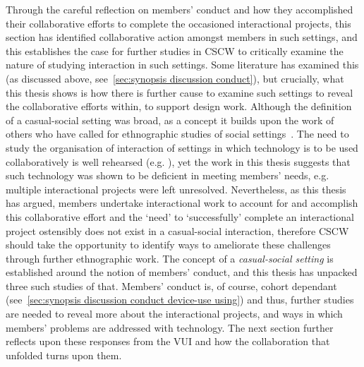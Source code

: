{\begin{revisedsubmission}
Through the careful reflection on members' conduct and how they accomplished their collaborative efforts to complete the occasioned interactional projects, this section has identified collaborative action amongst members in such settings, and this establishes the case for further studies in \ac{CSCW} to critically examine the nature of studying interaction in such settings.
Some literature has examined this (as discussed above, see~\ref{sec:synopsis discussion conduct}), but crucially, what this thesis shows is how there is further cause to examine such settings to reveal the collaborative efforts within, to support design work.
Although the definition of a casual-social setting was broad, as a concept it builds upon the work of others who have called for ethnographic studies of social settings~\citep{Grudin1990}.
The need to study the organisation of interaction of settings in which technology is to be used collaboratively is well rehearsed (e.g. \citet{Crabtree2009,Heath1994}), yet the work in this thesis suggests that such technology was shown to be deficient in meeting members' needs, e.g. multiple interactional projects were left unresolved. %
Nevertheless, as this thesis has argued, members undertake interactional work to account for and accomplish this collaborative effort and the `need' to `successfully' complete an interactional project ostensibly does not exist in a casual-social interaction, therefore \ac{CSCW} should take the opportunity to identify ways to ameliorate these challenges through further ethnographic work.
The concept of a \textit{casual-social setting} is established around the notion of members' conduct, and this thesis has unpacked three such studies of that.
Members' conduct is, of course, cohort dependant (see~\ref{sec:synopsis discussion conduct device-use using}) and thus, further studies are needed to reveal more about the interactional projects, and ways in which members' problems are addressed with technology.
The next section further reflects upon these responses from the \ac{VUI} and how the collaboration that unfolded turns upon them.
\end{revisedsubmission}



}
